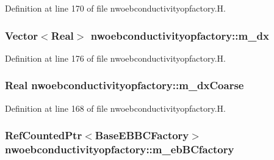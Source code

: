 Definition at line 170 of file nwoebconductivityopfactory.\+H.

\subsubsection[{\texorpdfstring{m\+\_\+dx}{m_dx}}]{\setlength{\rightskip}{0pt plus 5cm}Vector$<$Real$>$ nwoebconductivityopfactory\+::m\+\_\+dx\hspace{0.3cm}{\ttfamily [protected]}}\hypertarget{classnwoebconductivityopfactory_a6fc0b58b8908dfa7c89cd1649a3ee2c5}{}\label{classnwoebconductivityopfactory_a6fc0b58b8908dfa7c89cd1649a3ee2c5}


Definition at line 176 of file nwoebconductivityopfactory.\+H.

\subsubsection[{\texorpdfstring{m\+\_\+dx\+Coarse}{m_dxCoarse}}]{\setlength{\rightskip}{0pt plus 5cm}Real nwoebconductivityopfactory\+::m\+\_\+dx\+Coarse\hspace{0.3cm}{\ttfamily [protected]}}\hypertarget{classnwoebconductivityopfactory_a9fd6b8c8299421af2eec3b3b02415094}{}\label{classnwoebconductivityopfactory_a9fd6b8c8299421af2eec3b3b02415094}


Definition at line 168 of file nwoebconductivityopfactory.\+H.

\subsubsection[{\texorpdfstring{m\+\_\+eb\+B\+Cfactory}{m_ebBCfactory}}]{\setlength{\rightskip}{0pt plus 5cm}Ref\+Counted\+Ptr$<$Base\+E\+B\+B\+C\+Factory$>$ nwoebconductivityopfactory\+::m\+\_\+eb\+B\+Cfactory\hspace{0.3cm}{\ttfamily [protected]}}\hypertarget{classnwoebconductivityopfactory_a82c9f54cba8a6cfa83a1965189c4ce17}{}\label{classnwoebconductivityopfactory_a82c9f54cba8a6cfa83a1965189c4ce17}


